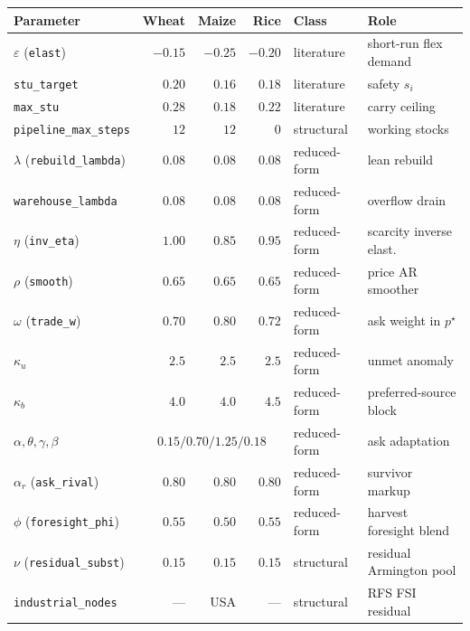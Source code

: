 \begin{tabular}{l rrr ll}
\toprule
Parameter & Wheat & Maize & Rice & Class & Role \\
\midrule
$\varepsilon$ (\texttt{elast}) & $-0.15$ & $-0.25$ & $-0.20$ & literature & short-run flex demand \\
\texttt{stu\_target} & $0.20$ & $0.16$ & $0.18$ & literature & safety $s_i$ \\
\texttt{max\_stu} & $0.28$ & $0.18$ & $0.22$ & literature & carry ceiling \\
\texttt{pipeline\_max\_steps} & $12$ & $12$ & $0$ & structural & working stocks \\
$\lambda$ (\texttt{rebuild\_lambda}) & $0.08$ & $0.08$ & $0.08$ & reduced-form & lean rebuild \\
\texttt{warehouse\_lambda} & $0.08$ & $0.08$ & $0.08$ & reduced-form & overflow drain \\
$\eta$ (\texttt{inv\_eta}) & $1.00$ & $0.85$ & $0.95$ & reduced-form & scarcity inverse elast. \\
$\rho$ (\texttt{smooth}) & $0.65$ & $0.65$ & $0.65$ & reduced-form & price AR smoother \\
$\omega$ (\texttt{trade\_w}) & $0.70$ & $0.80$ & $0.72$ & reduced-form & ask weight in $p^\star$ \\
$\kappa_u$ & $2.5$ & $2.5$ & $2.5$ & reduced-form & unmet anomaly \\
$\kappa_b$ & $4.0$ & $4.0$ & $4.5$ & reduced-form & preferred-source block \\
$\alpha,\theta,\gamma,\beta$ & \multicolumn{3}{c}{$0.15/0.70/1.25/0.18$} & reduced-form & ask adaptation \\
$\alpha_r$ (\texttt{ask\_rival}) & $0.80$ & $0.80$ & $0.80$ & reduced-form & survivor markup \\
$\phi$ (\texttt{foresight\_phi}) & $0.55$ & $0.50$ & $0.55$ & reduced-form & harvest foresight blend \\
$\nu$ (\texttt{residual\_subst}) & $0.15$ & $0.15$ & $0.15$ & structural & residual Armington pool \\
\texttt{industrial\_nodes} & --- & USA & --- & structural & RFS FSI residual \\
\bottomrule
\end{tabular}
